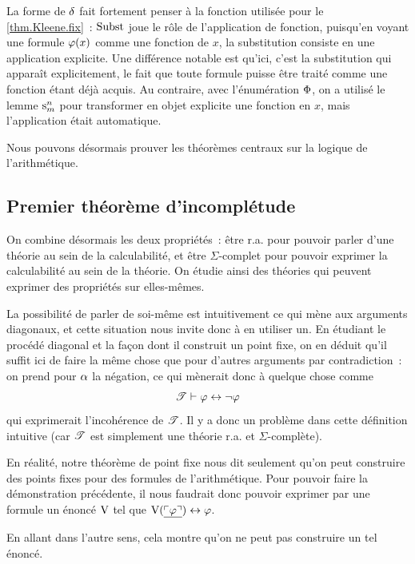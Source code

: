 \begin{remark}
  La forme de $\delta$ fait fortement penser à la fonction utilisée pour le
  \cref{thm.Kleene.fix}~: $\operatorname{Subst}$ joue le rôle de l'application de fonction,
  puisqu'en voyant une formule $\varphi(x)$ comme une fonction de $x$, la
  substitution consiste en une application explicite. Une différence notable est
  qu'ici, c'est la substitution qui apparaît explicitement, le fait que toute
  formule puisse être traité comme une fonction étant déjà acquis. Au contraire,
  avec l'énumération $\operatorname{\Phi}$, on a utilisé le lemme $\mathrm{s}_{m}^{n}$ pour
  transformer en objet explicite une fonction en $x$, mais l'application était
  automatique.
\end{remark}

Nous pouvons désormais prouver les théorèmes centraux sur la logique de
l'arithmétique.

\subsection{Premier théorème d'incomplétude}

On combine désormais les deux propriétés~: être r.a. pour pouvoir parler d'une
théorie au sein de la calculabilité, et être $\Sigma$-complet pour pouvoir
exprimer la calculabilité au sein de la théorie. On étudie ainsi des théories
qui peuvent exprimer des propriétés sur elles-mêmes.

La possibilité de parler de soi-même est intuitivement ce qui mène aux
arguments diagonaux, et cette situation nous invite donc à en utiliser un.
En étudiant le procédé diagonal et la façon dont il construit un point fixe, on
en déduit qu'il suffit ici de faire la même chose que pour d'autres arguments
par contradiction~: on prend pour $\alpha$ la négation, ce qui mènerait donc à
quelque chose comme
\[\mathscr T \vdash \varphi \mathrel{\leftrightarrow} \lnot \varphi\]
qui exprimerait l'incohérence de $\mathscr T$. Il y a donc un problème dans cette
définition intuitive (car $\mathscr T$ est simplement une théorie r.a. et
$\Sigma$-complète).

En réalité, notre théorème de point fixe nous dit seulement qu'on peut
construire des points fixes pour des formules de l'arithmétique. Pour pouvoir
faire la démonstration précédente, il nous faudrait donc pouvoir exprimer par
une formule un énoncé $\mathrm{V}$ tel que
$\mathrm{V}(\underline{\ulcorner\varphi\urcorner}) \mathrel{\leftrightarrow} \varphi$.

En allant dans l'autre sens, cela montre qu'on ne peut pas construire un tel
énoncé.

